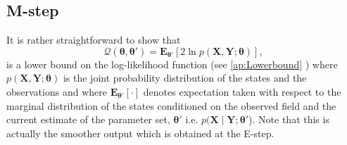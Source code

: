 \documentclass[review,authoryear,3p]{elsarticle}
\begin{document}
 \subsection{M-step}
It is rather straightforward to show that 
\begin{equation}
	\mathcal Q(\boldsymbol \theta,\boldsymbol\theta')= \mathbf E_{\boldsymbol \theta'}\left[2\ln p(\mathbf X,\mathbf Y;\boldsymbol \theta)\right], 
\end{equation}
is a lower bound on the log-likelihood function \cite{Bishop2006} (see \ref{ap:Lowerbound} )  where $p(\mathbf X,\mathbf Y;\boldsymbol \theta)$ is the joint probability distribution of the states and the observations and where $ \mathbf E_{\boldsymbol \theta'}\left[\cdot\right] $ denotes expectation taken with respect to the marginal distribution of the states conditioned on the observed field and the current estimate of the parameter set, $\boldsymbol\theta'$ i.e.  $p(\mathbf X\mid\mathbf Y;\boldsymbol \theta'$). Note that this is actually the smoother output which is obtained at the E-step.
\end{document}
